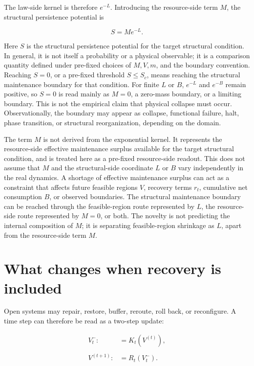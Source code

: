 \documentclass[12pt,a4paper]{article}
\begin{document}
The law-side kernel is therefore \(e^{-L}\). Introducing the resource-side term \(M\), the structural persistence potential is

\[
S=Me^{-L}.
\]

Here \(S\) is the structural persistence potential for the target structural condition. In general, it is not itself a probability or a physical observable; it is a comparison quantity defined under pre-fixed choices of \(M,V,m\), and the boundary convention. Reaching \(S=0\), or a pre-fixed threshold \(S\le S_{c}\), means reaching the structural maintenance boundary for that condition. For finite \(L\) or \(B\), \(e^{-L}\) and \(e^{-B}\) remain positive, so \(S=0\) is read mainly as \(M=0\), a zero-mass boundary, or a limiting boundary. This is not the empirical claim that physical collapse must occur. Observationally, the boundary may appear as collapse, functional failure, halt, phase transition, or structural reorganization, depending on the domain.

The term \(M\) is not derived from the exponential kernel. It represents the resource-side effective maintenance surplus available for the target structural condition, and is treated here as a pre-fixed resource-side readout. This does not assume that \(M\) and the structural-side coordinate \(L\) or \(B\) vary independently in the real dynamics. A shortage of effective maintenance surplus can act as a constraint that affects future feasible regions \(V\), recovery terms \(r_{t}\), cumulative net consumption \(B\), or observed boundaries. The structural maintenance boundary can be reached through the feasible-region route represented by \(L\), the resource-side route represented by \(M=0\), or both. The novelty is not predicting the internal composition of \(M\); it is separating feasible-region shrinkage as \(L\), apart from the resource-side term \(M\).

\section{What changes when recovery is included}\label{what-changes-when-recovery-is-included}

Open systems may repair, restore, buffer, reroute, roll back, or reconfigure. A time step can therefore be read as a two-step update:

\[
\begin{aligned}
V_{t}^- :&= K_{t}(V^{(t)}), \\
\qquad \\
V^{(t+1)} :&= R_{t}(V_{t}^-).
\end{aligned}
\]
\end{document}
